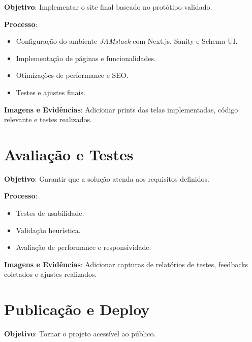\textbf{Objetivo}: Implementar o site final baseado no protótipo validado.

\textbf{Processo}:
\begin{itemize}
    \item Configuração do ambiente \textit{JAMstack} com Next.js, Sanity e Schema UI.
    \item Implementação de páginas e funcionalidades.
    \item Otimizações de performance e SEO.
    \item Testes e ajustes finais.
\end{itemize}

\textbf{Imagens e Evidências}:
Adicionar prints das telas implementadas, código relevante e testes realizados.

\section{Avaliação e Testes}
\label{sec:avaliacao_testes}

\textbf{Objetivo}: Garantir que a solução atenda aos requisitos definidos.

\textbf{Processo}:
\begin{itemize}
    \item Testes de usabilidade.
    \item Validação heurística.
    \item Avaliação de performance e responsividade.
\end{itemize}

\textbf{Imagens e Evidências}:
Adicionar capturas de relatórios de testes, feedbacks coletados e ajustes realizados.

\section{Publicação e Deploy}
\label{sec:publicacao_deploy}

\textbf{Objetivo}: Tornar o projeto acessível ao público.

